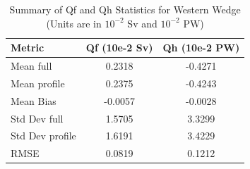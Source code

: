 \begin{table}[h!]
\centering
\caption{Summary of Qf and Qh Statistics for Western Wedge (Units are in $10^{-2}$ Sv and $10^{-2}$ PW)}
\label{tab:stats_summary_Western Wedge}
\begin{tabular}{|l|c|c|}
\hline
Metric & Qf (10e-2 Sv) & Qh (10e-2 PW) \\
\hline
\hline
Mean full & 0.2318 & -0.4271 \\
Mean profile & 0.2375 & -0.4243 \\
Mean Bias & -0.0057 & -0.0028 \\
\hline
Std Dev full & 1.5705 & 3.3299 \\
Std Dev profile & 1.6191 & 3.4229 \\
RMSE & 0.0819 & 0.1212 \\
\hline
\end{tabular}
\end{table}
